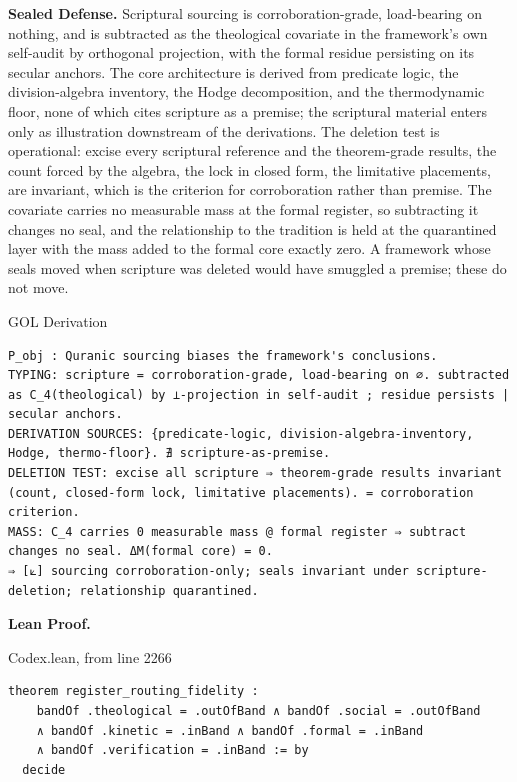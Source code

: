 \documentclass[10pt,twocolumn]{article}
\begin{document}
\textbf{Sealed Defense.} Scriptural sourcing is corroboration-grade,
load-bearing on nothing, and is subtracted as the theological covariate
in the framework's own self-audit by orthogonal projection, with the
formal residue persisting on its secular anchors. The core architecture
is derived from predicate logic, the division-algebra inventory, the
Hodge decomposition, and the thermodynamic floor, none of which cites
scripture as a premise; the scriptural material enters only as
illustration downstream of the derivations. The deletion test is
operational: excise every scriptural reference and the theorem-grade
results, the count forced by the algebra, the lock in closed form, the
limitative placements, are invariant, which is the criterion for
corroboration rather than premise. The covariate carries no measurable
mass at the formal register, so subtracting it changes no seal, and the
relationship to the tradition is held at the quarantined layer with the
mass added to the formal core exactly zero. A framework whose seals
moved when scripture was deleted would have smuggled a premise; these do
not move.

\begin{golbox}{GOL Derivation}
\begin{lstlisting}[style=golv]
P_obj : Quranic sourcing biases the framework's conclusions.
TYPING: scripture = corroboration-grade, load-bearing on ∅. subtracted as C_4(theological) by ⊥-projection in self-audit ; residue persists | secular anchors.
DERIVATION SOURCES: {predicate-logic, division-algebra-inventory, Hodge, thermo-floor}. ∄ scripture-as-premise.
DELETION TEST: excise all scripture ⇒ theorem-grade results invariant (count, closed-form lock, limitative placements). = corroboration criterion.
MASS: C_4 carries 0 measurable mass @ formal register ⇒ subtract changes no seal. ΔM(formal core) = 0.
⇒ [⟀] sourcing corroboration-only; seals invariant under scripture-deletion; relationship quarantined.
\end{lstlisting}
\end{golbox}

\textbf{Lean Proof.}

\begin{leanexcerpt}{Codex.lean, from line 2266}
\begin{lstlisting}[style=leanx,firstnumber=2266]
theorem register_routing_fidelity :
    bandOf .theological = .outOfBand ∧ bandOf .social = .outOfBand
    ∧ bandOf .kinetic = .inBand ∧ bandOf .formal = .inBand
    ∧ bandOf .verification = .inBand := by
  decide
\end{lstlisting}
\end{leanexcerpt}
\end{document}

